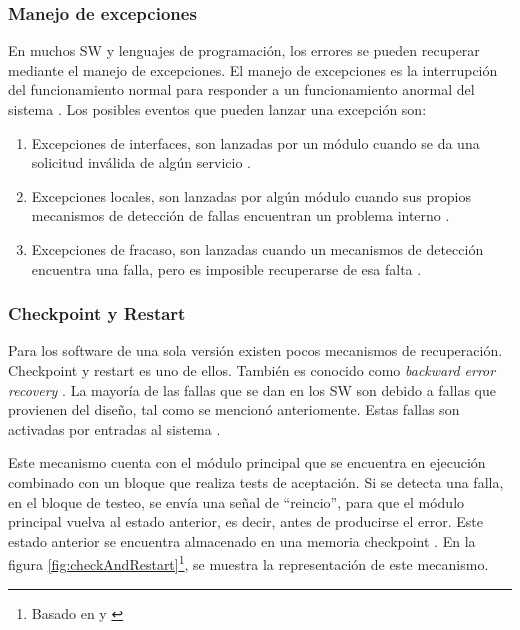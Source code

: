 \subsubsection{Manejo de excepciones}
En muchos \ac{SW} y lenguajes de programación, los errores se pueden recuperar mediante el manejo de 
excepciones. El manejo de excepciones es la interrupción del funcionamiento normal para responder a 
un funcionamiento anormal del sistema \citep{SoftwareFaultToleranceATutorial}. Los posibles eventos 
que pueden lanzar una excepción son:
\begin{enumerate}
 \item Excepciones de interfaces, son lanzadas por un módulo cuando se da una solicitud inválida de 
algún servicio \citep{FTDesign}.
 \item Excepciones locales, son lanzadas por algún módulo cuando sus propios mecanismos de 
detección de fallas encuentran un problema interno \citep{FTDesign}.
 \item Excepciones de fracaso, son lanzadas cuando un mecanismos de detección encuentra una falla, 
pero es imposible recuperarse de esa falta \citep{FTDesign}.
\end{enumerate}

\subsubsection{Checkpoint y Restart}
Para los software de una sola versión existen pocos mecanismos de recuperación. Checkpoint y restart 
es uno de ellos. También es conocido como \textit{backward error recovery} \citep{FTDesign}. La 
mayoría de las fallas que se dan en los \ac{SW} son debido a fallas que provienen del diseño, tal 
como se mencionó anteriomente. Estas fallas son activadas por entradas al sistema \citep{FTDesign}. 

Este mecanismo cuenta con el módulo principal que se encuentra en ejecución combinado con un bloque 
que realiza tests de aceptación. Si se detecta una falla, en el bloque de testeo, se envía una 
señal de ``reincio'', para que el módulo principal vuelva al estado anterior, es decir, antes de 
producirse el error. Este estado anterior se encuentra almacenado en una memoria checkpoint 
\citep{FTDesign}. En la figura \ref{fig:checkAndRestart}\footnote{Basado en \cite{FTDesign} y 
\cite{SoftwareFaultToleranceATutorial}}, se muestra la representación de este mecanismo.

